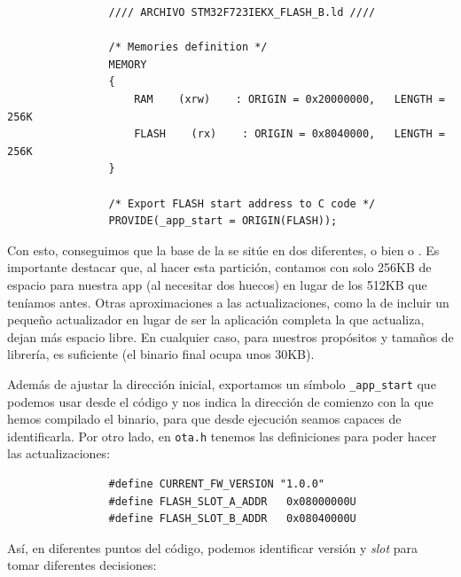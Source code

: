 \documentclass[../main.tex]{subfiles}
\begin{document}
            \begin{lstlisting}
                //// ARCHIVO STM32F723IEKX_FLASH_B.ld ////
                
                /* Memories definition */
                MEMORY
                {
                    RAM    (xrw)    : ORIGIN = 0x20000000,   LENGTH = 256K
                    FLASH    (rx)    : ORIGIN = 0x8040000,   LENGTH = 256K
                }

                /* Export FLASH start address to C code */
                PROVIDE(_app_start = ORIGIN(FLASH));
            \end{lstlisting}

            Con esto, conseguimos que la base de la  se sitúe en dos diferentes, o bien  o . Es importante destacar que, al hacer esta partición, contamos con solo 256KB de espacio para nuestra app (al necesitar dos huecos) en lugar de los 512KB que teníamos antes. Otras aproximaciones a las actualizaciones, como la de incluir un pequeño actualizador en lugar de ser la aplicación completa la que actualiza, dejan más espacio libre. En cualquier caso, para nuestros propósitos y tamaños de librería, es suficiente (el binario final ocupa unos 30KB).

            Además de ajustar la dirección inicial, exportamos un símbolo \texttt{\_app\_start} que podemos usar desde el código y nos indica la dirección de comienzo con la que hemos compilado el binario, para que desde ejecución seamos capaces de identificarla. Por otro lado, en \texttt{ota.h} tenemos las definiciones para poder hacer las actualizaciones:

            \begin{lstlisting}
                #define CURRENT_FW_VERSION "1.0.0"
                #define FLASH_SLOT_A_ADDR   0x08000000U
                #define FLASH_SLOT_B_ADDR   0x08040000U
            \end{lstlisting}

            Así, en diferentes puntos del código, podemos identificar versión y \emph{slot} para tomar diferentes decisiones:
\end{document}
